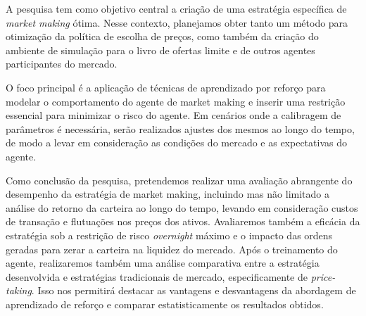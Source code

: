 A pesquisa tem como objetivo central a criação de uma estratégia específica de \textit{market making} ótima. Nesse contexto, planejamos obter tanto um método para otimização da política de escolha de preços, como também da criação do ambiente de simulação para o livro de ofertas limite e de outros agentes participantes do mercado.

O foco principal é a aplicação de técnicas de aprendizado por reforço para modelar o comportamento do agente de market making e inserir uma restrição essencial para minimizar o risco do agente. Em cenários onde a calibragem de parâmetros é necessária, serão realizados ajustes dos mesmos ao longo do tempo, de modo a levar em consideração as condições do mercado e as expectativas do agente.

Como conclusão da pesquisa, pretendemos realizar uma avaliação abrangente do desempenho da estratégia de market making, incluindo mas não limitado a análise do retorno da carteira ao longo do tempo, levando em consideração custos de transação e flutuações nos preços dos ativos. Avaliaremos também a eficácia da estratégia sob a restrição de risco \textit{overnight} máximo e o impacto das ordens geradas para zerar a carteira na liquidez do mercado. Após o treinamento do agente, realizaremos também uma análise comparativa entre a estratégia desenvolvida e estratégias tradicionais de mercado, especificamente de \textit{price-taking}. Isso nos permitirá destacar as vantagens e desvantagens da abordagem de aprendizado de reforço e comparar estatisticamente os resultados obtidos.
